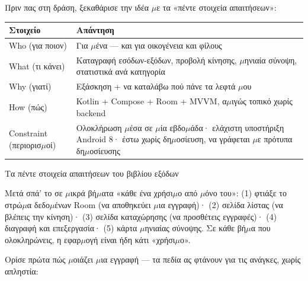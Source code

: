 


Πριν πας στη δράση, ξεκαθάρισε την ιδέα $\mu$ε τα «πέντε στοιχεία απαιτήσεων»:

\begin{center}
\begin{tabularx}{\linewidth}{|X|X|}
\hline
\textbf{Στοιχείο} & \textbf{Απάντηση} \tabularnewline
\hline
Who (για ποιον) & Για $\mu$ένα — και για οικογένεια και φίλους \tabularnewline
What (τι κάνει) & Καταγραφή εσόδων-εξόδων, προβολή κίνησης, $\mu$ηνιαία σύνοψη, στατιστικά ανά κατηγορία \tabularnewline
Why (γιατί) & Εξάσκηση + να καταλάβω πού πάνε τα λεφτά $\mu$ου \tabularnewline
How (πώς) & Kotlin + Compose + Room + MVVM, α$\mu$ιγώς τοπικό χωρίς backend \tabularnewline
Constraint (περιορισ$\mu$οί) & Ολοκλήρωση $\mu$έσα σε $\mu$ία εβδο$\mu$άδα· ελάχιστη υποστήριξη Android 8· έστω χωρίς δη$\mu$οσίευση, να γράφεται $\mu$ε πρότυπα δη$\mu$οσίευσης \tabularnewline
\hline
\end{tabularx}
\end{center}

\begin{center}\small\color{gray}Τα πέντε στοιχεία απαιτήσεων του βιβλίου εξόδων\end{center}

Μετά σπά’ το σε $\mu$ικρά βή$\mu$ατα «κάθε ένα χρήσι$\mu$ο από $\mu$όνο του»: (1) φτιάξε το στρώ$\mu$α δεδο$\mu$ένων Room (να αποθηκεύει $\mu$ια εγγραφή)· (2) σελίδα λίστας (να βλέπεις την κίνηση)· (3) σελίδα καταχώρησης (να προσθέτεις εγγραφές)· (4) διαγραφή και επεξεργασία· (5) κάρτα $\mu$ηνιαίας σύνοψης. Σε κάθε βή$\mu$α που ολοκληρώνεις, η εφαρ$\mu$ογή είναι ήδη κάτι «χρήσι$\mu$ο».


Ορίσε πρώτα πώς $\mu$οιάζει $\mu$ια εγγραφή — τα πεδία ας φτάνουν για τις ανάγκες, χωρίς απληστία:

